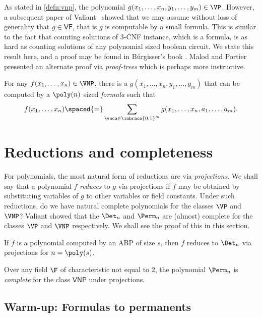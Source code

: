 As stated in \autoref{defn:vnp}, the polynomial $g(x_1,\dots, x_n, y_1,\dots, y_m) \in \VP$.
However, a subsequent paper of Valiant~\cite{v82} showed that we may assume without loss of generality that $g \in \mathsf{VF}$, that is $g$ is computable by a small formula.
This is similar to the fact that counting solutions of 3-\textsf{CNF} instance, which is a formula, is as hard as counting solutions of any polynomial sized boolean circuit.
We state this result here, and a proof may be found in B\"urgisser's book \cite{bur00}. Malod and Portier \cite{MP08} presented an alternate proof via \emph{proof-trees} which is perhaps more instructive.

\begin{theorem}\label{thm:vnp-formula}
For any $f(x_1,\dots, x_n)\in \VNP$, there is a $g(x_1,\dots, x_n, y_1,\dots, y_m)$ that can be computed by a $\poly(n)$ sized \emph{formula} such that
\[
f(x_1,\dots, x_n)\spaced{=} \sum_{\veca \in \inbrace{0,1}^m} g(x_1,\dots, x_n, a_1,\dots, a_m).
\]
\end{theorem}

\section{Reductions and completeness}

For polynomials, the most natural form of reductions are via \emph{projections}.
We shall say that a polynomial $f$ \emph{reduces} to $g$ via projections if $f$ may be obtained by substituting variables of $g$ to other variables or field constants.
Under such reductions, do we have natural complete polynomials for the classes $\VP$ and $\VNP$?
Valiant \cite{v79} showed that the $\Det_n$ and $\Perm_n$ are (almost) complete for the classes $\VP$ and $\VNP$ respectively.
We shall see the proof of this in this section.

\begin{theorem}[\cite{v79}]\label{thm:vp}
If $f$ is a polynomial computed by an ABP of size $s$, then $f$ reduces to $\Det_n$ via projections for $n = \poly(s)$.
\end{theorem}
\begin{theorem}[\cite{v79}]\label{thm:vnp}
Over any field $\F$ of characteristic not equal to $2$, the polynomial $\Perm_n$ is \emph{complete} for the class $\mathsf{VNP}$ under projections.
\end{theorem}

\subsection{Warm-up: Formulas to permanents}\label{sec:formula-to-dets}

